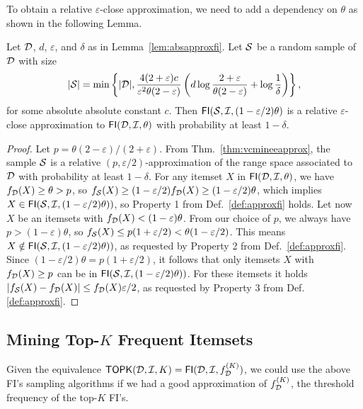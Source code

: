 To obtain a relative $\varepsilon$-close approximation, we
need to add a dependency on $\theta$ as shown in the following Lemma.

\begin{lemma}\label{lem:relapproxfi}
  Let ${\cal D}$, $d$, $\varepsilon$, and $\delta$ as in Lemma~\ref{lem:absapproxfi}. Let
  ${\cal S}$ be a random sample of ${\cal D}$ with size 
  \[
  |{\cal S}| =
  \min\left\{|{\cal D}|,\frac{4(2+\varepsilon)c}{\varepsilon^2\theta(2-\varepsilon)}\left(d\log\frac{2+\varepsilon}{\theta(2-\varepsilon)}+\log\frac{1}{\delta}\right)\right\},\]
  for some absolute absolute constant $c$. Then $\mathsf{FI}({\cal S},{\cal I},(1-\varepsilon/2)\theta)$ is a relative
  $\varepsilon$-close approximation to $\mathsf{FI}({\cal D},{\cal I},\theta)$ with probability
  at least $1-\delta$.
\end{lemma}

\begin{proof}
  Let $p=\theta(2-\varepsilon)/(2+\varepsilon)$. From
  Thm.~\ref{thm:vcmineeapprox}, the sample ${\cal S}$ is a relative
  $(p,\varepsilon/2)$-approximation of the range space associated to ${\cal D}$ with
  probability at least $1-\delta$. For any itemset $X$ in
  $\mathsf{FI}({\cal D},{\cal I},\theta)$, we have $f_{\cal D}(X)\ge\theta>p$, so
  $f_{\cal S}(X)\ge (1-\varepsilon/2)f_{\cal D}(X)\ge(1-\varepsilon/2)\theta$, which
  implies $X\in\mathsf{FI}({\cal S},{\cal I},(1-\varepsilon/2)\theta))$, so Property 1
  from Def.~\ref{def:approxfi} holds. Let now $X$ be an itemsets with
  $f_{\cal D}(X)< (1-\varepsilon)\theta$. From our choice of $p$, we always have
  $p>(1-\varepsilon)\theta$, so $f_{\cal S}(X)\le p(1+\varepsilon/2) <
  \theta(1-\varepsilon/2)$. This means
  $X\notin\mathsf{FI}({\cal S},{\cal I},(1-\varepsilon/2)\theta))$, as requested by
  Property 2 from Def.~\ref{def:approxfi}. 
  Since $(1-\varepsilon/2)\theta=p(1+\varepsilon/2)$, it follows
  that only itemsets $X$ with $f_{\cal D}(X)\ge p$ can be in
  $\mathsf{FI}({\cal S},{\cal I},(1-\varepsilon/2)\theta))$. For these itemsets it holds
  $|f_{\cal S}(X)-f_{\cal D}(X)|\le f_{\cal D}(X)\varepsilon/2$, as requested by
  Property 3 from Def.\ref{def:approxfi}.
\end{proof}

\subsection{Mining Top-$K$ Frequent Itemsets}\label{sec:miningtopk}
Given the equivalence
$\mathsf{TOPK}({\cal D},{\cal I},K)=\mathsf{FI}({\cal D},{\cal I},f^{(K)}_{\cal D})$, we could use the above
FI's sampling algorithms if we had a good approximation of $f^{(K)}_{\cal D}$, the
threshold frequency of the top-$K$ FI's.


